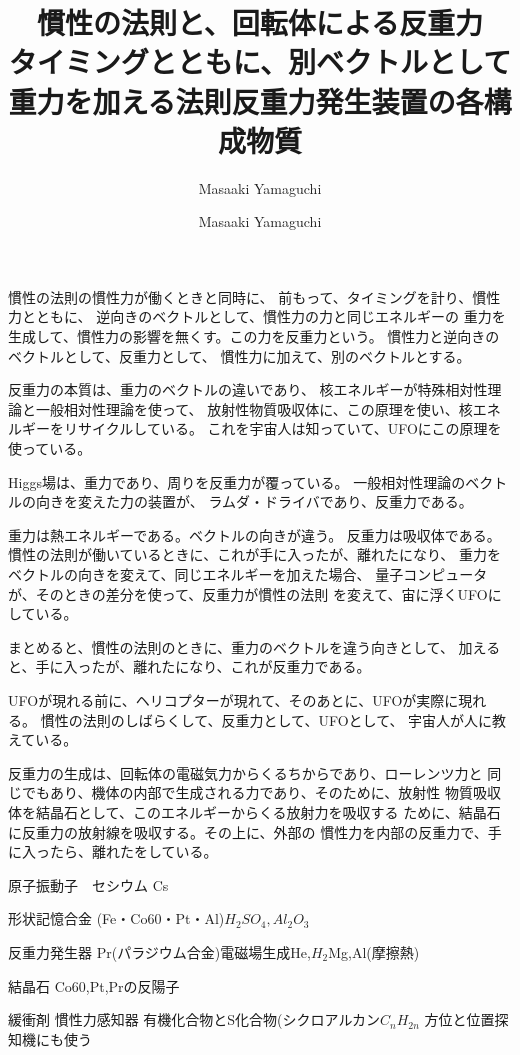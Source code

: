 \documentclass{jsarticle}
\begin{document}
\title{慣性の法則と、回転体による反重力 \\
タイミングとともに、別ベクトルとして重力を加える法則}
\author{Masaaki Yamaguchi}


   慣性の法則の慣性力が働くときと同時に、
   前もって、タイミングを計り、慣性力とともに、
   逆向きのベクトルとして、慣性力の力と同じエネルギーの
   重力を生成して、慣性力の影響を無くす。この力を反重力という。
   慣性力と逆向きのベクトルとして、反重力として、
   慣性力に加えて、別のベクトルとする。

   反重力の本質は、重力のベクトルの違いであり、
   核エネルギーが特殊相対性理論と一般相対性理論を使って、
   放射性物質吸収体に、この原理を使い、核エネルギーをリサイクルしている。
   これを宇宙人は知っていて、UFOにこの原理を使っている。

   Higgs場は、重力であり、周りを反重力が覆っている。
   一般相対性理論のベクトルの向きを変えた力の装置が、
   ラムダ・ドライバであり、反重力である。

   重力は熱エネルギーである。ベクトルの向きが違う。
   反重力は吸収体である。
   慣性の法則が働いているときに、これが手に入ったが、離れたになり、
   重力をベクトルの向きを変えて、同じエネルギーを加えた場合、
   量子コンピュータが、そのときの差分を使って、反重力が慣性の法則
   を変えて、宙に浮くUFOにしている。 

   まとめると、慣性の法則のときに、重力のベクトルを違う向きとして、
   加えると、手に入ったが、離れたになり、これが反重力である。 

   UFOが現れる前に、ヘリコプターが現れて、そのあとに、UFOが実際に現れる。
   慣性の法則のしばらくして、反重力として、UFOとして、
   宇宙人が人に教えている。

   反重力の生成は、回転体の電磁気力からくるちからであり、ローレンツ力と
   同じでもあり、機体の内部で生成される力であり、そのために、放射性
   物質吸収体を結晶石として、このエネルギーからくる放射力を吸収する
   ために、結晶石に反重力の放射線を吸収する。その上に、外部の
   慣性力を内部の反重力で、手に入ったら、離れたをしている。


\title{反重力発生装置の各構成物質}
\author{Masaaki Yamaguchi}


  原子振動子　セシウム Cs


  形状記憶合金 (Fe・Co60・Pt・Al)$H_2 SO_4, Al_2 O_3$


  反重力発生器 Pr(パラジウム合金)電磁場生成He,$H_2$Mg,Al(摩擦熱)


  結晶石 Co60,Pt,Prの反陽子


  緩衝剤 慣性力感知器 有機化合物とS化合物(シクロアルカン$C_n H_{2n}$
  方位と位置探知機にも使う
\end{document}
